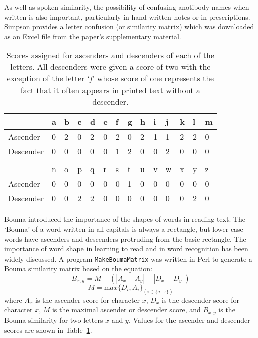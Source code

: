 \documentclass{article}
\newcommand{\eg}[1]{`\emph{#1}'}
\begin{document}
As well as spoken similarity, the possibility of confusing anotibody
names when written is also important, particularly in hand-written
notes or in prescriptions. Simpson\cite{simpson:xxx} provides a letter
confusion (or similarity matrix) which was downloaded as an Excel file
from the paper's supplementary material.

\begin{table}
\begin{center}
\begin{tabular}{llllllllllllll}\hline
          & a & b & c & d & e & f & g & h & i & j & k & l & m \\ \hline
Ascender  & 0 & 2 & 0 & 2 & 0 & 2 & 0 & 2 & 1 & 1 & 2 & 2 & 0 \\
Descender & 0 & 0 & 0 & 0 & 0 & 1 & 2 & 0 & 0 & 2 & 0 & 0 & 0 \\ \hline
          &   &   &   &   &   &   &   &   &   &   &   &   &   \\
          & n & o & p & q & r & s & t & u & v & w & x & y & z \\ \hline
Ascender  & 0 & 0 & 0 & 0 & 0 & 0 & 1 & 0 & 0 & 0 & 0 & 0 & 0 \\
Descender & 0 & 0 & 2 & 2 & 0 & 0 & 0 & 0 & 0 & 0 & 0 & 2 & 0 \\ \hline
\end{tabular}
\end{center}
  \caption{\label{tab:boumascores} Scores assigned for ascenders and
    descenders of each of the letters. All descenders were given a
    score of two with the exception of the letter \eg{f} whose score
    of one represents the fact that it often appears in printed text
    without a descender.}
\end{table}

Bouma\cite{xxx} introduced the importance of the shapes of words in
reading text. The `Bouma' of a word written in all-capitals is always
a rectangle, but lower-case words have ascenders and descenders
protruding from the basic rectangle. The importance of word shape in
learning to read and in word recognition has been widely
discussed\cite{xxx}.  A program \verb|MakeBoumaMatrix| was written in
Perl to generate a Bouma similarity matrix based on the equation:
\begin{equation}
  B_{x,y} = M - (|A_x - A_y| + |D_x - D_y|)
\end{equation}
\begin{equation}
  M={\mathrm max}\{D_i, A_i\}_{(i\in \{a\ldots z\})}
\end{equation}
where $A_x$ is the ascender score for character $x$, $D_x$ is the
descender score for character $x$, $M$ is the maximal ascender or
descender score, and $B_{x,y}$ is the Bouma similarity for two letters
$x$ and $y$. Values for the ascender and descender scores are shown in
Table~\ref{tab:boumascores}.
\end{document}

